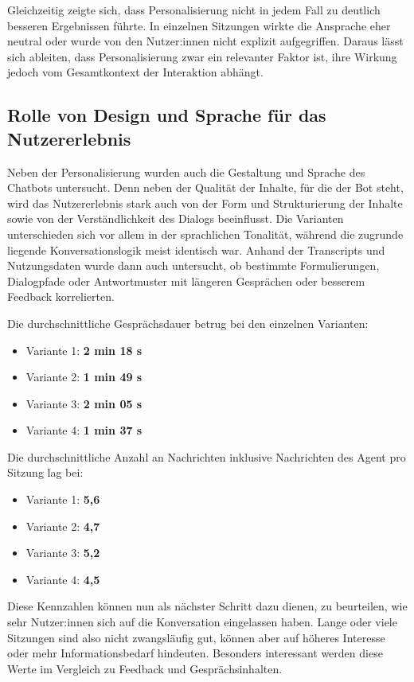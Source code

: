 Gleichzeitig zeigte sich, dass Personalisierung nicht in jedem Fall zu
deutlich besseren Ergebnissen führte. In einzelnen Sitzungen wirkte die
Ansprache eher neutral oder wurde von den Nutzer:innen nicht explizit
aufgegriffen. Daraus lässt sich ableiten, dass Personalisierung zwar ein
relevanter Faktor ist, ihre Wirkung jedoch vom Gesamtkontext der
Interaktion abhängt.

\subsection{Rolle von Design und Sprache für das Nutzererlebnis}

Neben der Personalisierung wurden auch die Gestaltung und Sprache des 
Chatbots untersucht. Denn neben der Qualität der Inhalte, für die der Bot steht, 
wird das Nutzererlebnis stark auch von der Form und Strukturierung der Inhalte 
sowie von der Verständlichkeit des Dialogs beeinflusst. Die Varianten 
unterschieden sich vor allem in der sprachlichen Tonalität, während die zugrunde 
liegende Konversationslogik meist identisch war. Anhand der Transcripts und 
Nutzungsdaten wurde dann auch untersucht, ob bestimmte Formulierungen, 
Dialogpfade oder Antwortmuster mit längeren Gesprächen oder besserem Feedback 
korrelierten.

Die durchschnittliche Gesprächsdauer betrug bei den einzelnen Varianten:
\begin{itemize}
    \item Variante 1: \textbf{2 min 18 s}
    \item Variante 2: \textbf{1 min 49 s}
    \item Variante 3: \textbf{2 min 05 s}
    \item Variante 4: \textbf{1 min 37 s}
\end{itemize}

Die durchschnittliche Anzahl an Nachrichten inklusive Nachrichten des Agent pro Sitzung lag bei:
\begin{itemize}
    \item Variante 1: \textbf{5,6}
    \item Variante 2: \textbf{4,7}
    \item Variante 3: \textbf{5,2}
    \item Variante 4: \textbf{4,5}
\end{itemize}

Diese Kennzahlen können nun als nächster Schritt dazu dienen, zu beurteilen, wie 
sehr Nutzer:innen sich auf die Konversation eingelassen haben. Lange oder viele 
Sitzungen sind also nicht zwangsläufig gut, können aber auf höheres Interesse 
oder mehr Informationsbedarf hindeuten. Besonders interessant werden diese Werte 
im Vergleich zu Feedback und Gesprächsinhalten.

